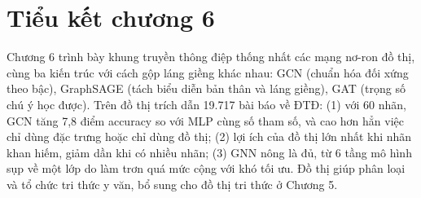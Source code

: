 \section{Tiểu kết chương 6}

Chương 6 trình bày khung truyền thông điệp thống nhất các mạng nơ-ron đồ thị, cùng ba kiến trúc với cách gộp láng giềng khác nhau: GCN (chuẩn hóa đối xứng theo bậc), GraphSAGE (tách biểu diễn bản thân và láng giềng), GAT (trọng số chú ý học được). Trên đồ thị trích dẫn 19.717 bài báo về ĐTĐ: (1) với 60 nhãn, GCN tăng 7,8 điểm accuracy so với MLP cùng số tham số, và cao hơn hẳn việc chỉ dùng đặc trưng hoặc chỉ dùng đồ thị; (2) lợi ích của đồ thị lớn nhất khi nhãn khan hiếm, giảm dần khi có nhiều nhãn; (3) GNN nông là đủ, từ 6 tầng mô hình sụp về một lớp do làm trơn quá mức cộng với khó tối ưu. Đồ thị giúp phân loại và tổ chức tri thức y văn, bổ sung cho đồ thị tri thức ở Chương 5.

